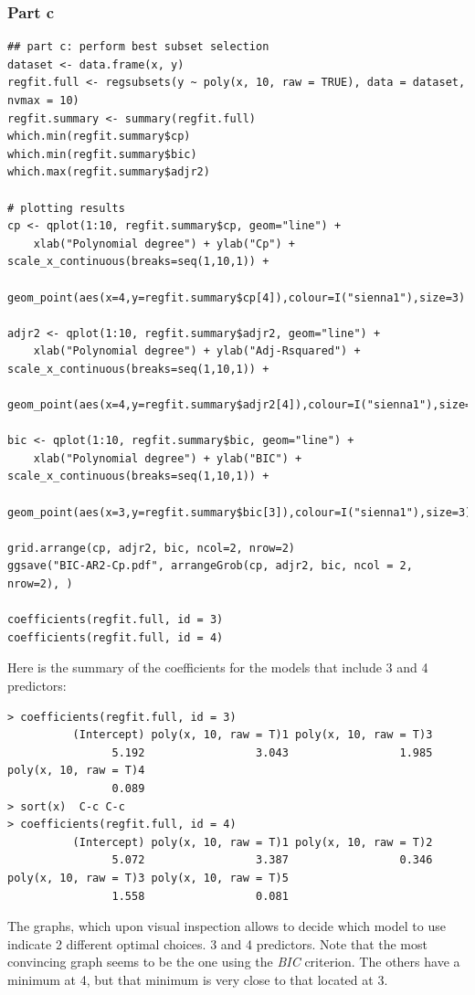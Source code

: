 \documentclass[11pt, a4paper]{article}
\begin{document}
\subsubsection{Part c}
\label{sec-2-1-2}


\begin{verbatim}
## part c: perform best subset selection
dataset <- data.frame(x, y)
regfit.full <- regsubsets(y ~ poly(x, 10, raw = TRUE), data = dataset, nvmax = 10)
regfit.summary <- summary(regfit.full)
which.min(regfit.summary$cp)
which.min(regfit.summary$bic)
which.max(regfit.summary$adjr2)

# plotting results
cp <- qplot(1:10, regfit.summary$cp, geom="line") +
    xlab("Polynomial degree") + ylab("Cp") + scale_x_continuous(breaks=seq(1,10,1)) +
    geom_point(aes(x=4,y=regfit.summary$cp[4]),colour=I("sienna1"),size=3)

adjr2 <- qplot(1:10, regfit.summary$adjr2, geom="line") +
    xlab("Polynomial degree") + ylab("Adj-Rsquared") + scale_x_continuous(breaks=seq(1,10,1)) +
    geom_point(aes(x=4,y=regfit.summary$adjr2[4]),colour=I("sienna1"),size=3)

bic <- qplot(1:10, regfit.summary$bic, geom="line") +
    xlab("Polynomial degree") + ylab("BIC") + scale_x_continuous(breaks=seq(1,10,1)) +
    geom_point(aes(x=3,y=regfit.summary$bic[3]),colour=I("sienna1"),size=3)

grid.arrange(cp, adjr2, bic, ncol=2, nrow=2)
ggsave("BIC-AR2-Cp.pdf", arrangeGrob(cp, adjr2, bic, ncol = 2, nrow=2), )

coefficients(regfit.full, id = 3)
coefficients(regfit.full, id = 4)
\end{verbatim}

Here is the summary of the coefficients for the models that include 3
and 4 predictors:


\begin{verbatim}
> coefficients(regfit.full, id = 3)
          (Intercept) poly(x, 10, raw = T)1 poly(x, 10, raw = T)3 
                5.192                 3.043                 1.985 
poly(x, 10, raw = T)4 
                0.089 
> sort(x)  C-c C-c
> coefficients(regfit.full, id = 4)
          (Intercept) poly(x, 10, raw = T)1 poly(x, 10, raw = T)2 
                5.072                 3.387                 0.346 
poly(x, 10, raw = T)3 poly(x, 10, raw = T)5 
                1.558                 0.081
\end{verbatim}

The graphs, which upon visual inspection allows to decide which model
to use indicate 2 different optimal choices. 3 and 4 predictors. Note
that the most convincing graph seems to be the one using the
\emph{BIC} criterion. The others have a minimum at 4, but that minimum
is very close to that located at 3.
\end{document}
